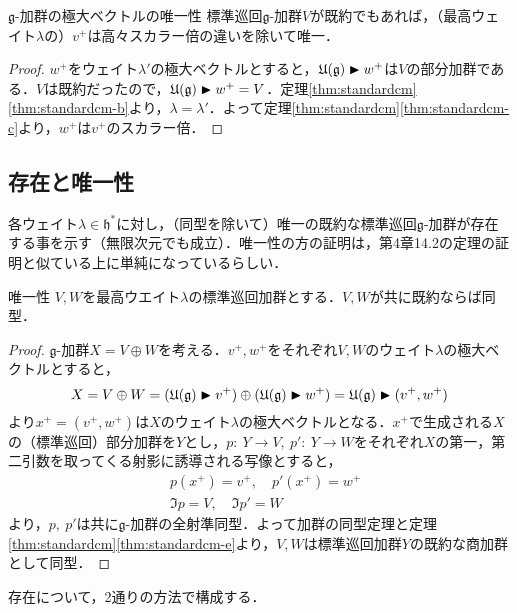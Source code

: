 \documentclass[rep_main]{subfiles}
\begin{document}
\begin{mycol}[label=col:standardcm]{$\mathfrak{g}$-加群の極大ベクトルの唯一性}
	標準巡回$\mathfrak{g}$-加群$V$が既約でもあれば，（最高ウェイト$\lambda$の）$v^+$は高々スカラー倍の違いを除いて唯一．
\end{mycol}
\begin{proof}
	$w^+$をウェイト$\lambda'$の極大ベクトルとすると，$\mathfrak{U}(\mathfrak{g}) \blacktriangleright w^+$は$V$の部分加群である．$V$は既約だったので，$\mathfrak{U}(\mathfrak{g}) \blacktriangleright w^+ = V$．定理\ref{thm:standardcm}\ref{thm:standardcm-b}より，$\lambda = \lambda'$．よって定理\ref{thm:standardcm}\ref{thm:standardcm-c}より，$w^+$は$v^+$のスカラー倍．
\end{proof}

\subsection{存在と唯一性}
各ウェイト$\lambda \in \mathfrak{h}^*$に対し，（同型を除いて）唯一の既約な標準巡回$\mathfrak{g}$-加群が存在する事を示す（無限次元でも成立）．唯一性の方の証明は，第4章14.2の定理の証明と似ている上に単純になっているらしい．
\begin{mytheo}[label=thm:standardcm-unique]{唯一性}
	$V, W$を最高ウエイト$\lambda$の標準巡回加群とする．$V, W$が共に既約ならば同型．
\end{mytheo}
\begin{proof}
	$\mathfrak{g}$-加群$X  = V \oplus W$を考える．$v^+, w^+$をそれぞれ$V, W$のウェイト$\lambda$の極大ベクトルとすると，
	\begin{equation}
		X = V \oplus W = (\mathfrak{U}(\mathfrak{g}) \blacktriangleright v^+) \oplus (\mathfrak{U}(\mathfrak{g}) \blacktriangleright w^+) = \mathfrak{U}(\mathfrak{g}) \blacktriangleright (v^+, w^+)
	\end{equation}
	より$x^+ = (v^+, w^+)$は$X$のウェイト$\lambda$の極大ベクトルとなる．$x^+$で生成される$X$の（標準巡回）部分加群を$Y$とし，$p:\ Y \to V,\ p':\ Y \to W$をそれぞれ$X$の第一，第二引数を取ってくる射影に誘導される写像とすると，
	\begin{align}
		&p(x^+) = v^+,\quad  p'(x^+) = w^+ \\
		&\Im p = V,\quad  \Im p' = W
	\end{align}
	より，$p,\ p'$は共に$\mathfrak{g}$-加群の全射準同型．よって加群の同型定理と定理\ref{thm:standardcm}\ref{thm:standardcm-e}より，$V, W$は標準巡回加群$Y$の既約な商加群として同型．
\end{proof}
存在について，2通りの方法で構成する．
\end{document}
